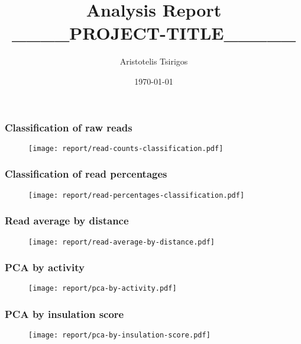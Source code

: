 \documentclass{beamer}
\title[Report]{Analysis Report \\ ____PROJECT-TITLE_____}
\author{Aristotelis Tsirigos} %
\institute[NYU] %
{
NYU School of Medicine\\ %
\medskip
\textit{aristotelis.tsirigos@nyumc.org} %
}
\date{\today} %
\begin{document}
\begin{frame}
\titlepage %
\end{frame}




\begin{frame}
\frametitle{Classification of raw reads}
\begin{figure}
\texttt{[image: report/read-counts-classification.pdf]}
\end{figure}
\end{frame}


\begin{frame}
\frametitle{Classification of read percentages}
\begin{figure}
\texttt{[image: report/read-percentages-classification.pdf]}
\end{figure}
\end{frame}


\begin{frame}
\frametitle{Read average by distance}
\begin{figure}
\texttt{[image: report/read-average-by-distance.pdf]}
\end{figure}
\end{frame}


\begin{frame}
\frametitle{PCA by activity}
\begin{figure}
\texttt{[image: report/pca-by-activity.pdf]}
\end{figure}
\end{frame}


\begin{frame}
\frametitle{PCA by insulation score}
\begin{figure}
\texttt{[image: report/pca-by-insulation-score.pdf]}
\end{figure}
\end{frame}
\end{document}
